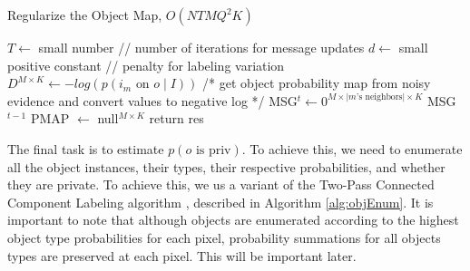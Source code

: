 \documentclass[11pt]{article}
\begin{document}
\begin{algorithm}[htp!]\label{alg:regObjMap}
\caption{Regularize the Object Map, $O(NTMQ^2K)$}
$T \leftarrow$ small number // number of iterations for message updates\;
$d \leftarrow$ small positive constant // penalty for labeling variation\;
$D^{M \times K} \leftarrow -log(p(i_m \textrm{ on } o \mid I))$ /* get object probability map from noisy evidence and convert values to negative log */\;
MSG$^t \leftarrow 0^{M \times \lvert m\textrm{'s neighbors} \rvert \times K}$\;
MSG$^{t-1}$\;
PMAP $\leftarrow$ null$^{M \times K}$\;
return res\;
\end{algorithm}


The final task is to estimate $p(o \textrm{ is priv})$.  To achieve this, we need to enumerate all the object instances, their types, their respective probabilities, and whether they are private.  To achieve this, we us a variant of the Two-Pass Connected Component Labeling algorithm \cite{hoshen1976percolation}, described in Algorithm \ref{alg:objEnum}.  It is important to note that although objects are enumerated according to the highest object type probabilities for each pixel, probability summations for all objects types are preserved at each pixel.  This will be important later.
\end{document}
